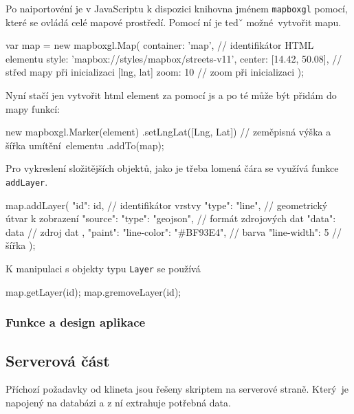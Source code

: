 \bigbreak

Po naiportovéní je v JavaScriptu k dispozici knihovna jménem \verb-mapboxgl- pomocí, které se ovládá celé mapové prostředí. Pomocí ní je tedˇ možné vytvořit mapu.
\begin{code}[frame=none]
var map = new mapboxgl.Map({
	container: 'map', // identifikátor HTML elementu
	style: 'mapbox://styles/mapbox/streets-v11',
	center: [14.42, 50.08], // střed mapy při
		inicializaci [lng, lat]
	zoom: 10 // zoom při inicializaci
});
\end{code}

\bigbreak

Nyní stačí jen vytvořit \gls{html} element za pomocí \gls{js} a po té může být přidám do mapy funkcí:
\begin{code}[frame=none]
new mapboxgl.Marker(element)
	.setLngLat([Lng, Lat]) // zeměpisná výška a šířka
		umítění elementu
	.addTo(map);
\end{code}

\bigbreak

Pro vykreslení složitějších objektů, jako je třeba lomená čára se využívá funkce \verb-addLayer-.
\begin{code}[frame=none]
map.addLayer({
	"id": id, // identifikátor vrstvy
	"type": "line", // geometrický útvar k zobrazení
	"source": {
		"type": "geojson", // formát zdrojových dat
		"data": data // zdroj dat
	},
	"paint": {
		"line-color": "#BF93E4", // barva
		"line-width": 5 // šířka
	}
});
\end{code}

\bigbreak

K manipulaci s objekty typu \verb-Layer- se používá
\begin{code}[frame=none]
map.getLayer(id);
map.gremoveLayer(id);
\end{code}

\subsubsection{Funkce a design aplikace}



\subsection{Serverová část}

Příchozí požadavky od klineta jsou řešeny skriptem na serverové straně. Který je napojený na databázi a z ní extrahuje potřebná data.

